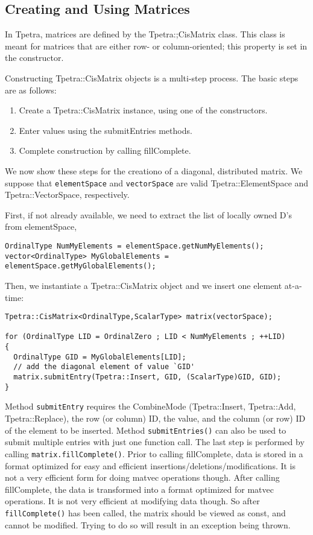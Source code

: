 \subsection{Creating and Using Matrices}
\label{sec:tpetra_matrices}

In Tpetra, matrices are defined by the Tpetra:;CisMatrix class. This class is
meant for matrices that are either row- or column-oriented; this property is
set in the constructor.

Constructing Tpetra::CisMatrix objects is a multi-step process. The basic
steps are as follows:
\begin{enumerate}
\itemsep=1pt
\item Create a Tpetra::CisMatrix instance, using one of the constructors.
\item Enter values using the submitEntries methods.
\item Complete construction by calling fillComplete.
\end{enumerate}
We now show these steps for the creationo of a diagonal, 
distributed matrix. We suppose that {\tt elementSpace} and
{\tt vectorSpace} are valid Tpetra::ElementSpace and Tpetra::VectorSpace,
  respectively.

First, if not already available, we need to extract the list of locally owned
D's from elementSpace,
\begin{verbatim}
OrdinalType NumMyElements = elementSpace.getNumMyElements();
vector<OrdinalType> MyGlobalElements = elementSpace.getMyGlobalElements();
\end{verbatim}
Then, we instantiate a Tpetra::CisMatrix object and we insert one element
at-a-time:
\begin{verbatim}
Tpetra::CisMatrix<OrdinalType,ScalarType> matrix(vectorSpace);

for (OrdinalType LID = OrdinalZero ; LID < NumMyElements ; ++LID)
{
  OrdinalType GID = MyGlobalElements[LID];
  // add the diagonal element of value `GID'
  matrix.submitEntry(Tpetra::Insert, GID, (ScalarType)GID, GID);
}
\end{verbatim}
Method {\tt submitEntry} requires the CombineMode 
(Tpetra::Insert, Tpetra::Add, Tpetra::Replace), the row (or column) ID, the
value, and the column (or row) ID of the
element to be inserted.  Method \verb!submitEntries()! can also be used to
submit multiple entries with just one function call. The last step is
performed by calling \verb!matrix.fillComplete()!. Prior
to calling fillComplete, data is stored in a format optimized for
easy and efficient insertions/deletions/modifications. It is not a
very efficient form for doing matvec operations though. After calling
fillComplete, the data is transformed into a format optimized for
matvec operations. It is not very efficient at modifying data though.
So after \verb!fillComplete()! has been called, the matrix should be viewed as
const, and cannot be modified. Trying to do so will result in an exception being thrown.

